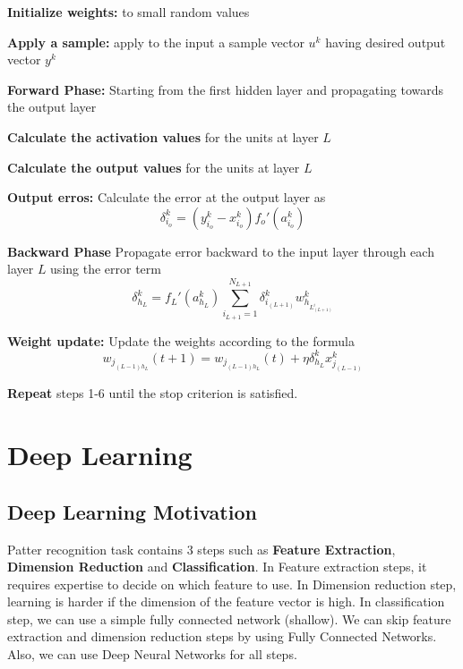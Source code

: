 \documentclass[12pt, a4paper, twoside]{book}
\begin{document}
\begin{steps}
    \item  \textbf{Initialize weights:} to small random values
    \item  \textbf{Apply a sample:} apply to the input a sample vector $u^k$ having desired output vector $y^k$
    \item  \textbf{Forward Phase:} Starting from the first hidden layer and propagating towards the output layer
    \begin{steps}
        \item \textbf{Calculate the activation values} for the units at layer $L$
        \item \textbf{Calculate the output values} for the units at layer $L$
    \end{steps} 
    \item \textbf{Output erros:} Calculate the error at the output layer as
    \[\delta_{i_o}^k = (y_{i_o}^k - x_{i_o}^k)f_o'(a_{i_o}^k)\]
    \item \textbf{Backward Phase} Propagate error backward to the input layer through each layer $L$ using the error term
    \[\delta_{h_L}^k = f_L'(a_{h_L}^k)\sum_{i_{L+1}=1}^{N_{L+1}}\delta_{i_{(L+1)}}^k w_{h_{L_{(L+1)}^i}}^k\]
    \item \textbf{Weight update:} Update the weights according to the formula
    \[w_{j_{(L-1)h_L}}(t+1) = w_{j_{(L-1)h_L}}(t) +\eta\delta_{h_L}^kx_{j_{(L-1)}}^k \] 
    \item \textbf{Repeat} steps 1-6 until the stop criterion is satisfied.
\end{steps}

\chapter{Deep Learning}
\section{Deep Learning Motivation}

Patter recognition task contains 3 steps such as \textbf{Feature Extraction}, \textbf{Dimension Reduction} and \textbf{Classification}. In Feature extraction steps, it requires expertise to decide on which feature to use.
In Dimension reduction step, learning is harder if the dimension of the feature vector is high. In classification step, we can use a simple fully connected network (shallow). We can skip feature extraction and dimension reduction steps by using Fully Connected Networks.
Also, we can use Deep Neural Networks for all steps. \\
\end{document}
